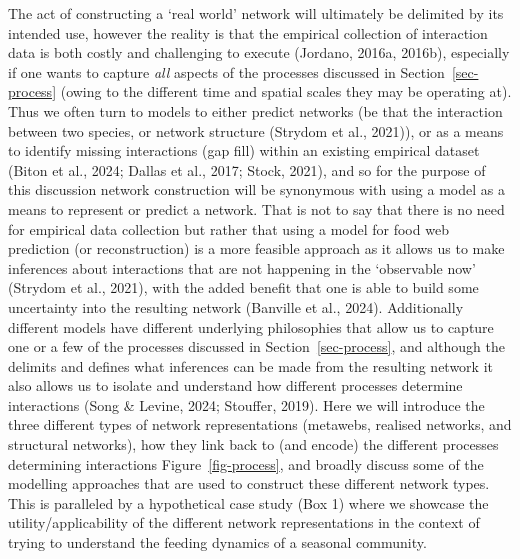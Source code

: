 \documentclass[
]{article}
\begin{document}
The act of constructing a `real world' network will ultimately be
delimited by its intended use, however the reality is that the empirical
collection of interaction data is both costly and challenging to execute
(Jordano, 2016a, 2016b), especially if one wants to capture \emph{all}
aspects of the processes discussed in Section~\ref{sec-process} (owing
to the different time and spatial scales they may be operating at). Thus
we often turn to models to either predict networks (be that the
interaction between two species, or network structure (Strydom et al.,
2021)), or as a means to identify missing interactions (gap fill) within
an existing empirical dataset (Biton et al., 2024; Dallas et al., 2017;
Stock, 2021), and so for the purpose of this discussion network
construction will be synonymous with using a model as a means to
represent or predict a network. That is not to say that there is no need
for empirical data collection but rather that using a model for food web
prediction (or reconstruction) is a more feasible approach as it allows
us to make inferences about interactions that are not happening in the
`observable now' (Strydom et al., 2021), with the added benefit that one
is able to build some uncertainty into the resulting network (Banville
et al., 2024). Additionally different models have different underlying
philosophies that allow us to capture one or a few of the processes
discussed in Section~\ref{sec-process}, and although the delimits and
defines what inferences can be made from the resulting network it also
allows us to isolate and understand how different processes determine
interactions (Song \& Levine, 2024; Stouffer, 2019). Here we will
introduce the three different types of network representations
(metawebs, realised networks, and structural networks), how they link
back to (and encode) the different processes determining interactions
Figure~\ref{fig-process}, and broadly discuss some of the modelling
approaches that are used to construct these different network types.
This is paralleled by a hypothetical case study (Box 1) where we
showcase the utility/applicability of the different network
representations in the context of trying to understand the feeding
dynamics of a seasonal community.
\end{document}
